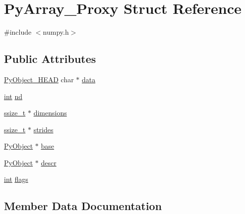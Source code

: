 \hypertarget{struct_py_array___proxy}{}\section{Py\+Array\+\_\+\+Proxy Struct Reference}
\label{struct_py_array___proxy}


{\ttfamily \#include $<$numpy.\+h$>$}

\subsection*{Public Attributes}
\begin{DoxyCompactItemize}
\item 
\mbox{\hyperlink{_python27_2object_8h_a0bf35c1f3ea13f925de94d8593db3b7e}{Py\+Object\+\_\+\+H\+E\+AD}} char $\ast$ \mbox{\hyperlink{struct_py_array___proxy_ad09936736edcfb5eae60e35bdc56e21d}{data}}
\item 
\mbox{\hyperlink{warnings_8h_a74f207b5aa4ba51c3a2ad59b219a423b}{int}} \mbox{\hyperlink{struct_py_array___proxy_ae92334a4a5bfa2f9aed55a51857d74d3}{nd}}
\item 
\mbox{\hyperlink{detail_2common_8h_ac430d16fc097b3bf0a7469cfd09decda}{ssize\+\_\+t}} $\ast$ \mbox{\hyperlink{struct_py_array___proxy_aaa6b3bbe3a72225a728f4d3af9ce828a}{dimensions}}
\item 
\mbox{\hyperlink{detail_2common_8h_ac430d16fc097b3bf0a7469cfd09decda}{ssize\+\_\+t}} $\ast$ \mbox{\hyperlink{struct_py_array___proxy_a7519a8fe4dd43c5de7ee7d8d271e97c8}{strides}}
\item 
\mbox{\hyperlink{_python27_2object_8h_aadc84ac7aed2cfa6f20c25f62bf3dac7}{Py\+Object}} $\ast$ \mbox{\hyperlink{struct_py_array___proxy_a4548e6ce724dda680cec7749e3ae6630}{base}}
\item 
\mbox{\hyperlink{_python27_2object_8h_aadc84ac7aed2cfa6f20c25f62bf3dac7}{Py\+Object}} $\ast$ \mbox{\hyperlink{struct_py_array___proxy_a61adbd0c265ff6e68f5d38d977179f2a}{descr}}
\item 
\mbox{\hyperlink{warnings_8h_a74f207b5aa4ba51c3a2ad59b219a423b}{int}} \mbox{\hyperlink{struct_py_array___proxy_a3eb84eade4ac85d3964c89b9b8a8645b}{flags}}
\end{DoxyCompactItemize}


\subsection{Member Data Documentation}
\mbox{\label{struct_py_array___proxy_a4548e6ce724dda680cec7749e3ae6630}} 
